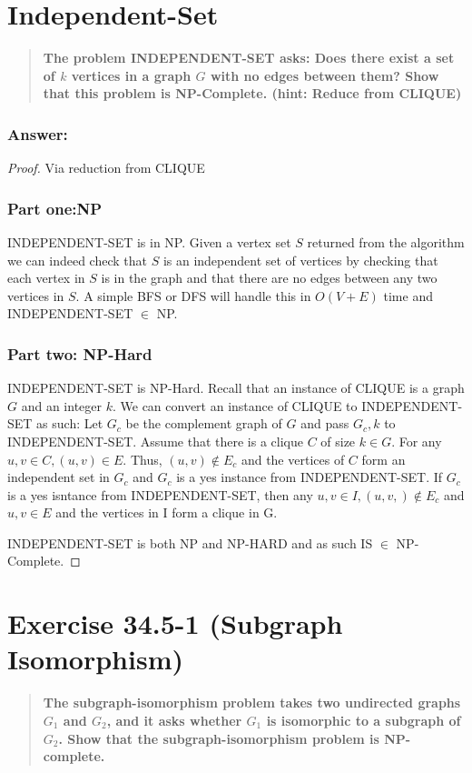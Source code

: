 \documentclass[titlepage]{article}\usepackage[]{graphicx}\usepackage[]{color}
\begin{document}
  
  \vspace{3cm}

\section{Independent-Set}
  \begin{quote}
  \textbf{The problem INDEPENDENT-SET asks: Does there exist a set of $k$
  vertices in a graph $G$ with no edges between them? Show that this problem is
  NP-Complete. (hint: Reduce from CLIQUE)}
  \end{quote}
  \subsubsection{Answer:}
  \begin{proof} Via reduction from CLIQUE
    \subsubsection{Part one:NP}
    INDEPENDENT-SET is in NP. Given a vertex set $S$ returned from the
    algorithm we can indeed check that $S$ is an independent set of vertices
    by checking that each vertex in $S$ is in the graph and that there are no
    edges between any two vertices in $S$. A simple BFS or DFS will handle this
    in $O(V+E)$ time and INDEPENDENT-SET $\in $ NP.
    \subsubsection{Part two: NP-Hard}
    INDEPENDENT-SET is NP-Hard. Recall that an instance of CLIQUE is a graph
    $G$ and an integer $k$. We can convert an instance of CLIQUE to
    INDEPENDENT-SET as such: Let $G_c$ be the complement graph of $G$ and pass
    $G_c,k$ to INDEPENDENT-SET.
    Assume that there is a clique $C$ of size $k \in G$. For any $u,v \in C,
    (u,v) \in E$. Thus, $(u,v) \notin E_c$ and the vertices of $C$ form an
    independent set in $G_c$ and $G_c$ is a yes instance from INDEPENDENT-SET.
    If $G_c$ is a yes isntance from INDEPENDENT-SET, then any $u,v \in I,
    (u,v,) \notin E_c$ and $u,v \in E$ and the vertices in I form a clique in
    G. 


    INDEPENDENT-SET is both NP and NP-HARD and as such IS $\in$ NP-Complete.
  \end{proof}








\section{Exercise 34.5-1 (Subgraph Isomorphism)}
  \begin{quote}
    \textbf{The subgraph-isomorphism problem takes two undirected graphs $G_1$ and
    $G_2$, and it asks whether $G_1$ is isomorphic to a subgraph of $G_2$. Show that the
    subgraph-isomorphism problem is NP-complete.}
  \end{quote}
\end{document}
